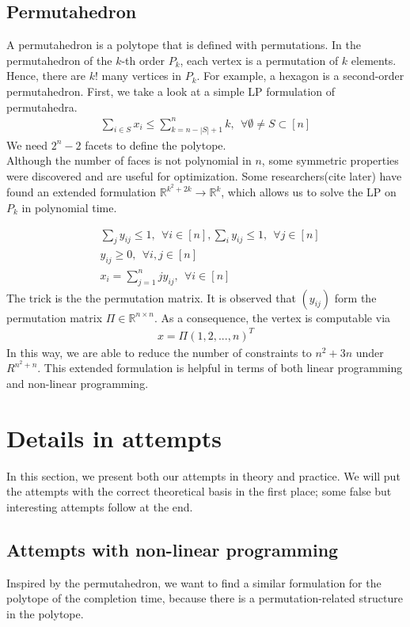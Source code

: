 \documentclass[12pt,letterpaper]{article}
\newcommand*{\R}{\mathbb{R}}
\begin{document}
\subsection{Permutahedron}
A permutahedron is a polytope that is defined with permutations. \cite{doi:10.1137/0122054}
In the permutahedron of the $k$-th order $P_k$, each vertex is a permutation of $k$ elements.
Hence, there are $k!$ many vertices in $P_k$. For example, a hexagon is a second-order permutahedron. 
First, we take a look at a simple LP formulation of permutahedra. 
\begin{align*}
    \sum_{i \in S} x_i \leq \sum_{k = n - |S| + 1}^n k, \ \ \forall \emptyset \neq S \subset [n]
\end{align*}
We need $2^n - 2$ facets to define the polytope.
\\
Although the number of faces is not polynomial in $n$,
some symmetric properties were discovered and are useful for optimization. Some researchers(cite later)
have found an extended formulation $\R^{k^2+2k} \rightarrow \R^{k}$, which allows us 
to solve the LP on $P_k$ in polynomial time. 

\begin{align}
    &\sum_{j} y_{ij} \leq 1, \ \ \forall i \in [n], \sum_{i} y_{ij} \leq 1, \ \ \forall j \in[n] \tag{B} \\ 
    &y_{ij} \geq 0, \ \ \forall i, j \in [n] \nonumber \\
    &x_i = \sum_{j = 1}^n j y_{ij}, \ \ \forall i \in [n] \nonumber
\end{align}
The trick is the the permutation matrix. It is observed that $(y_{ij})$ 
form the permutation matrix $\Pi \in \R^{n \times n}$. As a consequence, 
the vertex is computable via 
\begin{align*}
 x = \Pi (1, 2, ..., n)^T
\end{align*}
In this way, we are able to reduce the number of constraints to $n^2 + 3n$ under $R^{n^2 + n}$.
This extended formulation is helpful in terms of both linear programming and non-linear programming. 
\section{Details in attempts}
In this section, we present both our attempts in theory and practice. 
We will put the attempts with the correct theoretical basis in the first place; some false but interesting attempts follow at the end. 

\subsection{Attempts with non-linear programming}
Inspired by the permutahedron, we want to find a similar formulation for the polytope of the completion time,
because there is a permutation-related structure in the polytope. 
\end{document}
